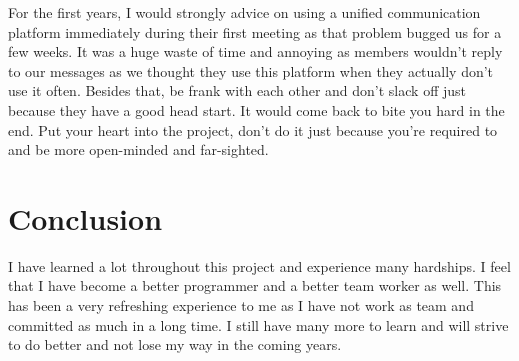 \documentclass[a4paper]{article}
\begin{document}
For the first years, I would strongly advice on using a unified communication platform immediately during their first meeting as that problem bugged us for a few weeks. It was a huge waste of time and annoying as members wouldn’t reply to our messages as we thought they use this platform when they actually don’t use it often. Besides that, be frank with each other and don’t slack off just because they have a good head start. It would come back to bite you hard in the end. Put your heart into the project, don’t do it just because you’re required to and be more open-minded and far-sighted.
\newline
\newline
\newline

\section{Conclusion}
I have learned a lot throughout this project and experience many hardships. I feel that I have become a better programmer and a better team worker as well. This has been a very refreshing experience to me as I have not work as team and committed as much in a long time. I still have many more to learn and will strive to do better and not lose my way in the coming years.
\newpage
\end{document}
